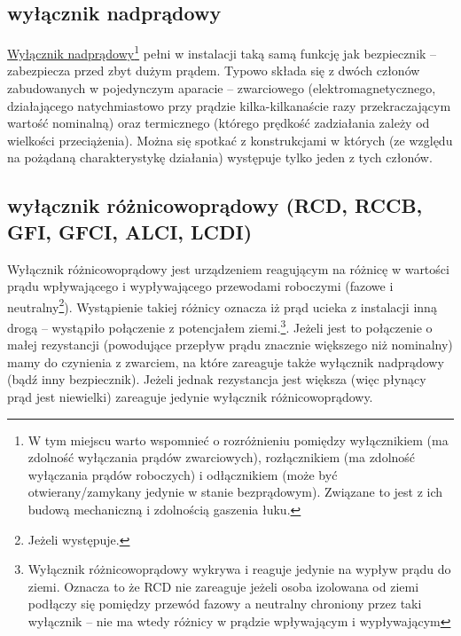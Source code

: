 \subsection{wyłącznik nadprądowy}

\href{https://pl.wikipedia.org/wiki/Wy\%C5\%82\%C4\%85cznik_instalacyjny}{Wyłącznik nadprądowy}\footnote{
	W tym miejscu warto wspomnieć o rozróżnieniu pomiędzy wyłącznikiem (ma zdolność wyłączania prądów zwarciowych), rozłącznikiem (ma zdolność wyłączania prądów roboczych) i odłącznikiem (może być otwierany/zamykany jedynie w stanie bezprądowym). Związane to jest z ich budową mechaniczną i zdolnością gaszenia łuku.
} pełni w instalacji taką samą funkcję jak bezpiecznik – zabezpiecza przed zbyt dużym prądem.
Typowo składa się z dwóch członów zabudowanych w pojedynczym aparacie – zwarciowego (elektromagnetycznego, działającego natychmiastowo przy prądzie kilka-kilkanaście razy przekraczającym wartość nominalną) oraz termicznego (którego prędkość zadziałania zależy od wielkości przeciążenia). Można się spotkać z konstrukcjami w których (ze względu na pożądaną charakterystykę działania) występuje tylko jeden z tych członów.

\subsection{wyłącznik różnicowoprądowy (RCD, RCCB, GFI, GFCI, ALCI, LCDI)}

Wyłącznik różnicowoprądowy jest urządzeniem reagującym na różnicę w wartości prądu wpływającego i wypływającego przewodami roboczymi (fazowe i neutralny\footnote{Jeżeli występuje.}).
Wystąpienie takiej różnicy oznacza iż prąd ucieka z instalacji inną drogą – wystąpiło połączenie z potencjałem ziemi.\footnote{
	Wyłącznik różnicowoprądowy wykrywa i reaguje jedynie na wypływ prądu do ziemi.
	Oznacza to że RCD nie zareaguje jeżeli osoba izolowana od ziemi podłączy się pomiędzy przewód fazowy a neutralny chroniony przez taki wyłącznik – nie ma wtedy różnicy w prądzie wpływającym i wypływającym
}.
Jeżeli jest to połączenie o małej rezystancji (powodujące przepływ prądu znacznie większego niż nominalny) mamy do czynienia z zwarciem, na które zareaguje także wyłącznik nadprądowy (bądź inny bezpiecznik).
Jeżeli jednak rezystancja jest większa (więc płynący prąd jest niewielki) zareaguje jedynie wyłącznik różnicowoprądowy.

